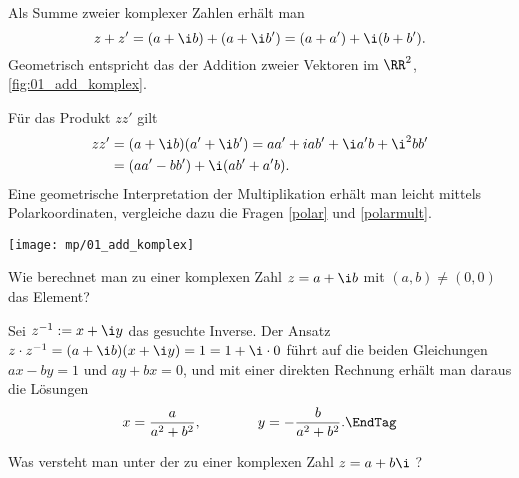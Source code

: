 \begin{antwort}[]
  \Ant Als Summe zweier komplexer Zahlen erhält man
  \begin{equation*}
    z+z' = (a+\i b)+(a+\i b')=(a+a')+\i (b+b').
  \end{equation*}
  Geometrisch entspricht das der Addition zweier Vektoren im $\RR^2$, 
  \sieheAbbildung\ref{fig:01_add_komplex}.

  \noindent
  Für das Produkt $zz'$ gilt
  \begin{align*}
    z z' &= (a+\i b)(a'+ \i b')=aa'+iab'+\i a'b +\i ^2 bb' \\ 
    &= (aa'-bb')+\i (ab'+a'b).
  \end{align*}
  Eine geometrische Interpretation der Multiplikation 
  erhält man leicht mittels Polarkoordinaten, vergleiche dazu die Fragen 
  \ref{polar} und \ref{polarmult}. \AntEnd

  \begin{center}
    \texttt{[image: mp/01\_add\_komplex]}
    \label{fig:01_add_komplex}
  \end{center}

\end{antwort}






\begin{frage}
  Wie berechnet man zu einer komplexen Zahl $z=a+\i b$ 
  mit $(a,b)\not=(0,0)$ das  
  Element?
\end{frage}

\begin{antwort}
  Sei $z^{-1}:=x+\i y$ das gesuchte Inverse. Der Ansatz 
  $z\cdot z^{-1} = (a+\i b)(x+\i y) = 1 = 1+ \i\cdot 0$ 
  führt auf die beiden Gleichungen $ax-by=1$ und $ay+bx=0$, und mit 
  einer direkten Rechnung erhält man daraus die Lösungen 
  \begin{equation}
    x=\frac{a}{a^2+b^2}, \qquad\qquad y=-\frac{b}{a^2+b^2}. 
    \EndTag
  \end{equation}
\end{antwort}






\begin{frage}
  Was versteht man unter der zu einer komplexen Zahl $z=a+b\i$ 
  ?
\end{frage}


